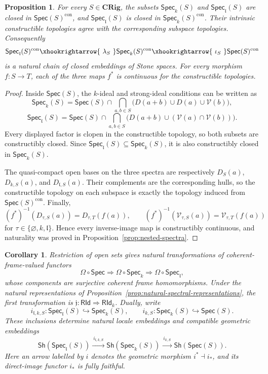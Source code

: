 \documentclass[12pt,leqno]{amsart}
\newcommand{\CRig}{\mathbf{CRig}}
\newcommand{\Sh}{\mathsf{Sh}}
\newcommand{\Spec}{\mathsf{Spec}}
\newcommand{\Speck}{\mathsf{Spec}_{k}}
\newcommand{\Specl}{\mathsf{Spec}_{\mathfrak l}}
\newcommand{\RId}{\mathsf{RId}}
\newcommand{\RIdk}{\mathsf{RId}_{k}}
\newtheorem{proposition}[theorem]{Proposition}
\newtheorem{corollary}[theorem]{Corollary}
\theoremstyle{definition}
\numberwithin{equation}{section}
\theoremstyle{remark}
\begin{document}
\begin{proposition}\label{prop:constructible-spectra}
For every \(S\in\CRig\), the subsets \(\Speck(S)\) and \(\Specl(S)\) are closed in \(\Spec(S)^{\mathrm{con}}\), and \(\Specl(S)\) is closed in \(\Speck(S)^{\mathrm{con}}\). Their intrinsic constructible topologies agree with the corresponding subspace topologies. Consequently
\[
\Specl(S)^{\mathrm{con}}
 \xhookrightarrow{\ \lambda_S\ }
\Speck(S)^{\mathrm{con}}
 \xhookrightarrow{\ \iota_S\ }
\Spec(S)^{\mathrm{con}}
\]
is a natural chain of closed embeddings of Stone spaces. For every morphism \(f\colon S\to T\), each of the three maps $f^*$ is continuous for the constructible topologies.
\end{proposition}

\begin{proof}
Inside \(\Spec(S)\), the $k$-ideal and strong-ideal conditions can be written as
\[
\Speck(S)
 =\Spec(S)\cap
  \bigcap_{a,b\in S}
  \bigl(D(a+b)\cup D(a)\cup\mathcal V(b)\bigr),
\]
\[
\Specl(S)
 =\Spec(S)\cap
  \bigcap_{a,b\in S}
  \bigl(D(a+b)\cup(\mathcal V(a)\cap\mathcal V(b))\bigr).
\]
Every displayed factor is clopen in the constructible topology, so both subsets are constructibly closed. Since \(\Specl(S)\subseteq\Speck(S)\), it is also constructibly closed in \(\Speck(S)\).

The quasi-compact open bases on the three spectra are respectively
\(D_S(a)\), \(D_{k,S}(a)\), and \(D_{\mathfrak l,S}(a)\). Their complements are the corresponding hulls, so the constructible topology on each subspace is exactly the topology induced from \(\Spec(S)^{\mathrm{con}}\). Finally,
\[
(f^*)^{-1}(D_{\tau,S}(a))=D_{\tau,T}(f(a)),
\qquad
(f^*)^{-1}(\mathcal V_{\tau,S}(a))=\mathcal V_{\tau,T}(f(a))
\]
for \(\tau\in\{\varnothing,k,\mathfrak l\}\). Hence every inverse-image map is constructibly continuous, and naturality was proved in Proposition~\ref{prop:nested-spectra}.
\end{proof}

\begin{corollary}\label{cor:localic-sheaf-spectral-comparison}
Restriction of open sets gives natural transformations of coherent-frame-valued functors
\[
\Omega\circ\Spec
 \Longrightarrow
\Omega\circ\Speck
 \Longrightarrow
\Omega\circ\Specl,
\]
whose components are surjective coherent frame homomorphisms. Under the natural representations of Proposition~\ref{prop:natural-spectral-representations}, the first transformation is \(\mathfrak j\colon\RId\Rightarrow\RIdk\). Dually, write
\[
i_{\mathfrak l,k,S}\colon\Specl(S)\hookrightarrow\Speck(S),
\qquad
i_{k,S}\colon\Speck(S)\hookrightarrow\Spec(S).
\]
These inclusions determine natural locale embeddings and compatible geometric embeddings
\[
\Sh(\Specl(S))
 \xrightarrow{\ i_{\mathfrak l,k,S}\ }
\Sh(\Speck(S))
 \xrightarrow{\ i_{k,S}\ }
\Sh(\Spec(S)).
\]
Here an arrow labelled by $i$ denotes the geometric morphism
\(i^*\dashv i_*\), and its direct-image functor $i_*$ is fully faithful.
\end{corollary}
\end{document}
